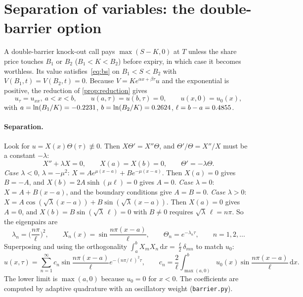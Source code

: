 \documentclass[11pt,a4paper]{article}
\theoremstyle{definition}
\theoremstyle{remark}
\newcommand{\dd}{\,\mathrm{d}}
\begin{document}
\section{Separation of variables: the double-barrier option}\label{sec:barrier}

A double-barrier knock-out call pays $\max(S-K,0)$ at $T$ unless the share price touches $B_1$ or $B_2$
($B_1<K<B_2$) before expiry, in which case it becomes worthless. Its value satisfies~\eqref{eq:bs} on
$B_1<S<B_2$ with $V(B_1,t)=V(B_2,t)=0$. Because $V=Ke^{\alpha x+\beta\tau}u$ and the exponential is
positive, the reduction of \cref{prop:reduction} gives
\begin{equation}\label{eq:barrierpde}
  u_\tau=u_{xx},\ a<x<b,\qquad u(a,\tau)=u(b,\tau)=0,\qquad u(x,0)=u_0(x),
\end{equation}
with $a=\ln(B_1/K)=\num{-0.2231}$, $b=\ln(B_2/K)=\num{0.2624}$, $\ell=b-a=\num{0.4855}$.

\paragraph{Separation.} Look for $u=X(x)\Theta(\tau)\not\equiv0$. Then $X\Theta'=X''\Theta$, and
$\Theta'/\Theta=X''/X$ must be a constant $-\lambda$:
\[
  X''+\lambda X=0,\qquad X(a)=X(b)=0,\qquad \Theta'=-\lambda\Theta .
\]
\emph{Case $\lambda<0$}, $\lambda=-\mu^2$: $X=Ae^{\mu(x-a)}+Be^{-\mu(x-a)}$. Then $X(a)=0$ gives $B=-A$, and
$X(b)=2A\sinh(\mu\ell)=0$ gives $A=0$. \emph{Case $\lambda=0$}: $X=A+B(x-a)$, and the boundary
conditions give $A=B=0$. \emph{Case $\lambda>0$}: $X=A\cos(\sqrt\lambda(x-a))+B\sin(\sqrt\lambda(x-a))$.
Then $X(a)=0$ gives $A=0$, and $X(b)=B\sin(\sqrt\lambda\,\ell)=0$ with $B\neq0$ requires
$\sqrt\lambda\,\ell=n\pi$. So the eigenpairs are
\[
  \lambda_n=\Big(\frac{n\pi}{\ell}\Big)^2,\qquad X_n(x)=\sin\frac{n\pi(x-a)}{\ell},\qquad
  \Theta_n=e^{-\lambda_n\tau},\qquad n=1,2,\dots
\]
Superposing and using the orthogonality $\int_a^bX_mX_n\dd x=\frac{\ell}{2}\delta_{mn}$ to match $u_0$:
\begin{equation}\label{eq:series}
  u(x,\tau)=\sum_{n=1}^\infty c_n\sin\frac{n\pi(x-a)}{\ell}e^{-(n\pi/\ell)^2\tau},\qquad
  c_n=\frac2\ell\int_{\max(a,0)}^{b}u_0(x)\sin\frac{n\pi(x-a)}{\ell}\dd x .
\end{equation}
The lower limit is $\max(a,0)$ because $u_0=0$ for $x<0$. The coefficients are computed by adaptive
quadrature with an oscillatory weight (\texttt{barrier.py}).
\end{document}
